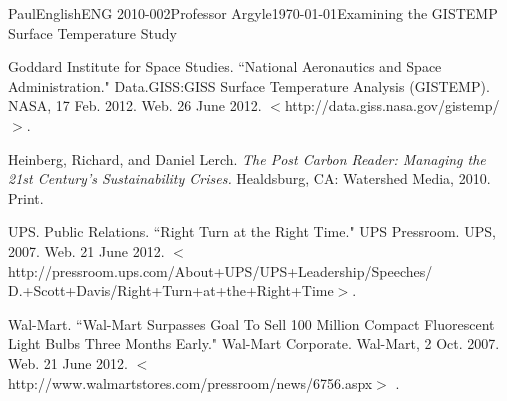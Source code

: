 \documentclass[12pt,letterpaper]{article}
\begin{document}
\begin{mla}{Paul}{English}{ENG 2010-002}{Professor Argyle}{\today}{Examining the GISTEMP Surface Temperature Study}
\begin{workscited}

\bibent
Goddard Institute for Space Studies. ``National Aeronautics and Space Administration." Data.GISS:GISS Surface Temperature Analysis (GISTEMP). NASA, 17 Feb. 2012. Web. 26 June 2012. $<$http://data.giss.nasa.gov/gistemp/$>$.

\bibent
Heinberg, Richard, and Daniel Lerch. \textit{The Post Carbon Reader: Managing the 21st Century's Sustainability Crises.} Healdsburg, CA: Watershed Media, 2010. Print.

\bibent
UPS. Public Relations. ``Right Turn at the Right Time." UPS Pressroom. UPS, 2007. Web. 21 June 2012. $<$http://pressroom.ups.com/About+UPS/UPS+Leadership/Speeches/\\D.+Scott+Davis/Right+Turn+at+the+Right+Time$>$.

\bibent
Wal-Mart. ``Wal-Mart Surpasses Goal To Sell 100 Million Compact Fluorescent Light Bulbs Three Months Early." Wal-Mart Corporate. Wal-Mart, 2 Oct. 2007. Web. 21 June 2012. $<$http://www.walmartstores.com/pressroom/news/6756.aspx$>$ .


\end{workscited}
\end{mla}
\end{document}
